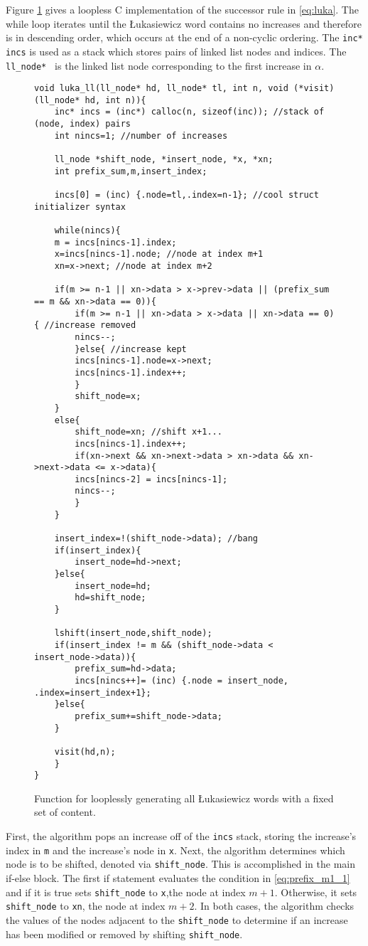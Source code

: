 Figure \ref{fig:lukaCode} gives a loopless C implementation of the successor rule in \eqref{eq:luka}.  The while loop iterates until the Łukasiewicz word contains no increases and therefore is in descending order, which occurs at the end of a non-cyclic ordering.  The \verb$inc* incs$ is used as a stack which stores pairs of linked list nodes and indices.  The \verb$ll_node* $ is the linked list node corresponding to the first increase in $\alpha$.  

\begin{figure}
\begin{Verbatim}
void luka_ll(ll_node* hd, ll_node* tl, int n, void (*visit)(ll_node* hd, int n)){
    inc* incs = (inc*) calloc(n, sizeof(inc)); //stack of (node, index) pairs
    int nincs=1; //number of increases

    ll_node *shift_node, *insert_node, *x, *xn;
    int prefix_sum,m,insert_index;

    incs[0] = (inc) {.node=tl,.index=n-1}; //cool struct initializer syntax

    while(nincs){
	m = incs[nincs-1].index;
	x=incs[nincs-1].node; //node at index m+1
	xn=x->next; //node at index m+2

	if(m >= n-1 || xn->data > x->prev->data || (prefix_sum == m && xn->data == 0)){
	    if(m >= n-1 || xn->data > x->data || xn->data == 0){ //increase removed
		nincs--;
	    }else{ //increase kept
		incs[nincs-1].node=x->next;
		incs[nincs-1].index++;
	    }
	    shift_node=x;
	}
	else{ 
	    shift_node=xn; //shift x+1...
	    incs[nincs-1].index++;
	    if(xn->next && xn->next->data > xn->data && xn->next->data <= x->data){
		incs[nincs-2] = incs[nincs-1];
		nincs--;
	    }
	}

	insert_index=!(shift_node->data); //bang
	if(insert_index){
	    insert_node=hd->next;
	}else{
	    insert_node=hd;
	    hd=shift_node;
	}

	lshift(insert_node,shift_node);
	if(insert_index != m && (shift_node->data < insert_node->data)){
	    prefix_sum=hd->data;
	    incs[nincs++]= (inc) {.node = insert_node, .index=insert_index+1};
	}else{
	    prefix_sum+=shift_node->data;
	}

	visit(hd,n);
    }
}
\end{Verbatim}

\caption{Function for looplessly generating all Łukasiewicz words with a fixed set of content.}
\label{fig:lukaCode}
\end{figure}

First, the algorithm pops an increase off of the \verb$incs$ stack, storing the increase's index in \verb$m$ and the increase's node in \verb$x$.  Next, the algorithm determines which node is to be shifted, denoted via \verb$shift_node$.  This is accomplished in the main if-else block.  The first if statement evaluates the condition in \eqref{eq:prefix_m1_1} and if it is true sets \verb$shift_node$ to \verb$x$,the node at index $m+1$. Otherwise, it sets \verb$shift_node$ to \verb$xn$, the node at index $m+2$.  In both cases, the algorithm checks the values of the nodes adjacent to the \verb$shift_node$ to determine if an increase has been modified or removed by shifting \verb$shift_node$.

